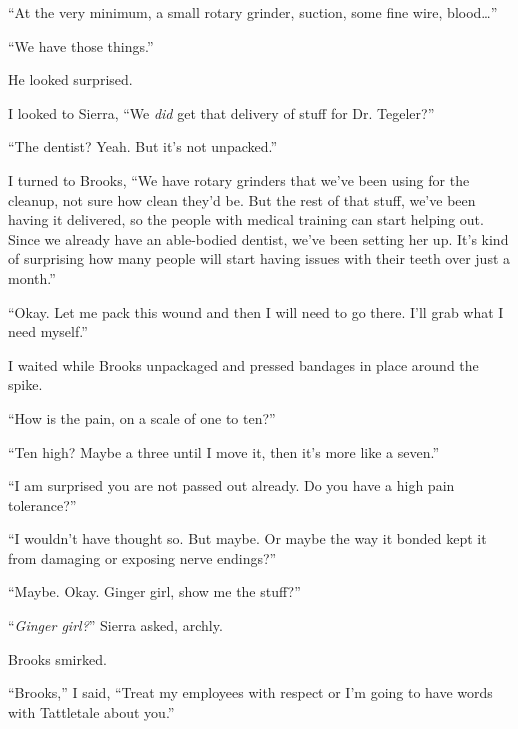 ``At the very minimum, a small rotary grinder, suction, some fine wire, blood\ldots''



``We have those things.''



He looked surprised.



I looked to Sierra, ``We \emph{did} get that delivery of stuff for Dr. Tegeler?''



``The dentist?  Yeah.  But it's not unpacked.''



I turned to Brooks, ``We have rotary grinders that we've been using for the cleanup, not sure how clean they'd be.  But the rest of that stuff, we've been having it delivered, so the people with medical training can start helping out.  Since we already have an able-bodied dentist, we've been setting her up.  It's kind of surprising how many people will start having issues with their teeth over just a month.''



``Okay.  Let me pack this wound and then I will need to go there.  I'll grab what I need myself.''



I waited while Brooks unpackaged and pressed bandages in place around the spike.



``How is the pain, on a scale of one to ten?''



``Ten high?  Maybe a three until I move it, then it's more like a seven.''



``I am surprised you are not passed out already.  Do you have a high pain tolerance?''



``I wouldn't have thought so.  But maybe.  Or maybe the way it bonded kept it from damaging or exposing nerve endings?''



``Maybe.  Okay.  Ginger girl, show me the stuff?''



``\emph{Ginger girl?}''  Sierra asked, archly.



Brooks smirked.



``Brooks,'' I said, ``Treat my employees with respect or I'm going to have words with Tattletale about you.''



